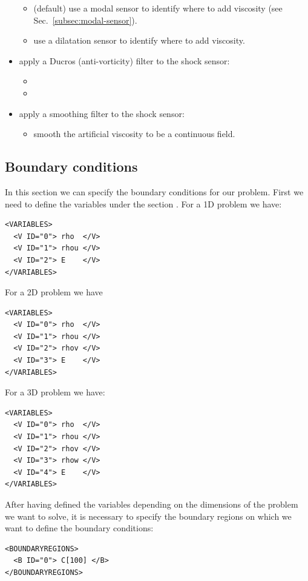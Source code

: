 \begin{itemize}
    \begin{itemize}
      \item {} (default) use a modal sensor to identify where to add viscosity (see Sec.~\ref{subsec:modal-sensor}).
      \item {} use a dilatation sensor to identify where to add viscosity.
    \end{itemize}
  \item {} apply a Ducros \cite{ducros1999large} (anti-vorticity) filter to the shock sensor:
    \begin{itemize}
      \item {}
      \item {}
    \end{itemize}
  \item {} apply a smoothing filter to the shock sensor:
    \begin{itemize}
      \item {} smooth the artificial viscosity to be a continuous field.
    \end{itemize}
\end{itemize}

\subsection*{Boundary conditions}
In this section we can specify the boundary conditions for our problem.
First we need to define the variables under the section .
For a 1D problem we have:
\begin{lstlisting}[style=XmlStyle]
<VARIABLES>
  <V ID="0"> rho  </V>
  <V ID="1"> rhou </V>
  <V ID="2"> E    </V>
</VARIABLES>
\end{lstlisting}

For a 2D problem we have
\begin{lstlisting}[style=XmlStyle]
<VARIABLES>
  <V ID="0"> rho  </V>
  <V ID="1"> rhou </V>
  <V ID="2"> rhov </V>
  <V ID="3"> E    </V>
</VARIABLES>
\end{lstlisting}

For a 3D problem we have:
\begin{lstlisting}[style=XmlStyle]
<VARIABLES>
  <V ID="0"> rho  </V>
  <V ID="1"> rhou </V>
  <V ID="2"> rhov </V>
  <V ID="3"> rhow </V>
  <V ID="4"> E    </V>
</VARIABLES>
\end{lstlisting}

After having defined the variables depending on the dimensions of the problem we want to solve,
it is necessary to specify the boundary regions on which we want to define the boundary conditions:
\begin{lstlisting}[style=XmlStyle]
<BOUNDARYREGIONS>
  <B ID="0"> C[100] </B>
</BOUNDARYREGIONS>
\end{lstlisting}

